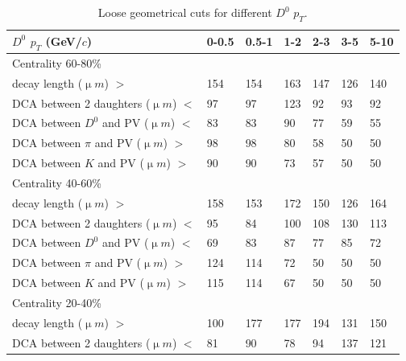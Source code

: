 \begin{table}[htp]
  \centering
  \caption{Loose geometrical cuts for different $D^0$ $p_T$.}
  \label{geometryCutsLoose}
  \begin{center}
    \begin{tabular}{l|l|l|l|l|l|l}
      $D^0$ $p_T$ (GeV/$c$) & 0-0.5 & 0.5-1 & 1-2 & 2-3 & 3-5 & 5-10\\ \hline
      Centrality  60-80\% & &  & &  & & \\ \hline
      decay length (${\upmu}m$) $>$ & 154 & 154 & 163 & 147 & 126 & 140\\ \hline
      DCA between 2 daughters (${\upmu}m$) $<$ & 97 & 97 & 123 & 92 & 93 & 92\\ \hline
      DCA between $D^0$ and PV (${\upmu}m$) $<$ & 83 & 83 & 90 & 77 & 59 & 55\\ \hline
      DCA between $\pi$ and PV (${\upmu}m$) $>$ & 98 & 98 & 80 & 58 & 50 & 50\\ \hline
      DCA between $K$ and PV (${\upmu}m$) $>$ & 90 & 90 & 73 & 57 & 50 & 50\\ \hline
      Centrality  40-60\% &  &  &  &  & & \\ \hline
      decay length (${\upmu}m$) $>$ & 158 & 153 & 172 & 150 & 126 & 164\\ \hline
      DCA between 2 daughters (${\upmu}m$) $<$ & 95 & 84 & 100 & 108 & 130 & 113\\ \hline
      DCA between $D^0$ and PV (${\upmu}m$) $<$ & 69 & 83 & 87 & 77 & 85 & 72\\ \hline
      DCA between $\pi$ and PV (${\upmu}m$) $>$ & 124 & 114 & 72 & 50 & 50 & 50\\ \hline
      DCA between $K$ and PV (${\upmu}m$) $>$ & 115 & 114 & 67 & 50 & 50 & 50\\ \hline
      Centrality  20-40\% &  &  &  &  & & \\ \hline
      decay length (${\upmu}m$) $>$ & 100 & 177 & 177 & 194 & 131 & 150\\ \hline
      DCA between 2 daughters (${\upmu}m$) $<$ & 81 & 90 & 78 & 94 & 137 & 121\\ \hline

\end{tabular}
\end{center}
\end{table}
